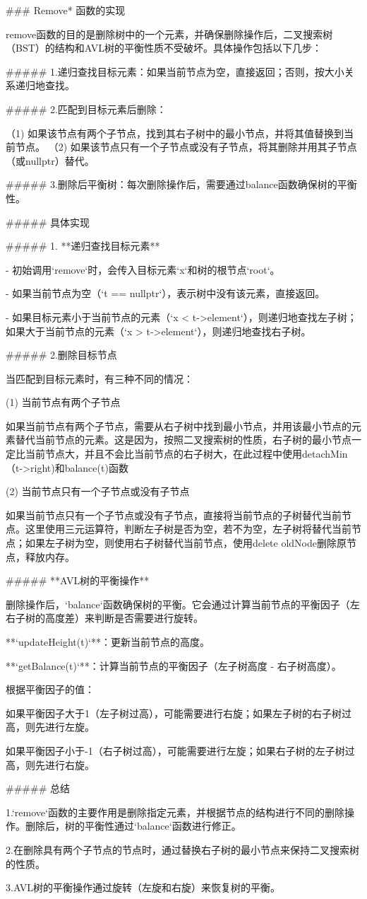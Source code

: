 ###                                                         Remove* 函数的实现

​        remove函数的目的是删除树中的一个元素，并确保删除操作后，二叉搜索树（BST）的结构和AVL树的平衡性质不受破坏。具体操作包括以下几步：

##### 1.递归查找目标元素：如果当前节点为空，直接返回；否则，按大小关系递归地查找。

##### 2.匹配到目标元素后删除：

（1)  如果该节点有两个子节点，找到其右子树中的最小节点，并将其值替换到当前节点。
（2)  如果该节点只有一个子节点或没有子节点，将其删除并用其子节点（或nullptr）替代。

##### 3.删除后平衡树：每次删除操作后，需要通过balance函数确保树的平衡性。

##### 具体实现

##### 1. **递归查找目标元素**

- 初始调用`remove`时，会传入目标元素`x`和树的根节点`root`。

- 如果当前节点为空（`t == nullptr`），表示树中没有该元素，直接返回。

- 如果目标元素小于当前节点的元素（`x < t->element`），则递归地查找左子树；如果大于当前节点的元素（`x > t->element`），则递归地查找右子树。

  ##### 2.删除目标节点

  当匹配到目标元素时，有三种不同的情况：

  (1) 当前节点有两个子节点

  如果当前节点有两个子节点，需要从右子树中找到最小节点，并用该最小节点的元素替代当前节点的元素。这是因为，按照二叉搜索树的性质，右子树的最小节点一定比当前节点大，并且不会比当前节点的右子树大，在此过程中使用detachMin（t->right)和balance(t)函数

  (2) 当前节点只有一个子节点或没有子节点

  如果当前节点只有一个子节点或没有子节点，直接将当前节点的子树替代当前节点。这里使用三元运算符，判断左子树是否为空，若不为空，左子树将替代当前节点；如果左子树为空，则使用右子树替代当前节点，使用delete oldNode删除原节点，释放内存。

  ##### **AVL树的平衡操作**

  删除操作后，`balance`函数确保树的平衡。它会通过计算当前节点的平衡因子（左右子树的高度差）来判断是否需要进行旋转。

  **`updateHeight(t)`**：更新当前节点的高度。

  **`getBalance(t)`**：计算当前节点的平衡因子（左子树高度 - 右子树高度）。

  根据平衡因子的值：

    如果平衡因子大于1（左子树过高），可能需要进行右旋；如果左子树的右子树过高，则先进行左旋。

    如果平衡因子小于-1（右子树过高），可能需要进行左旋；如果右子树的左子树过高，则先进行右旋。

  ##### 总结

  1.`remove`函数的主要作用是删除指定元素，并根据节点的结构进行不同的删除操作。删除后，树的平衡性通过`balance`函数进行修正。

  2.在删除具有两个子节点的节点时，通过替换右子树的最小节点来保持二叉搜索树的性质。

  3.AVL树的平衡操作通过旋转（左旋和右旋）来恢复树的平衡。

  

  

